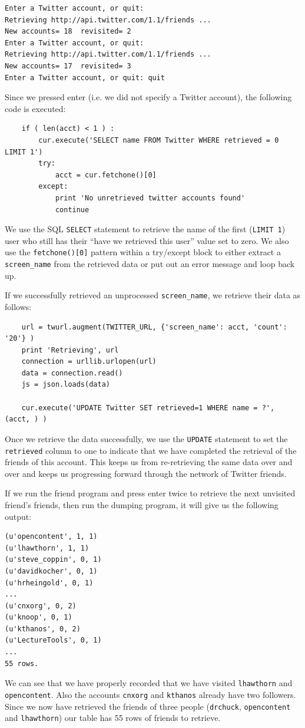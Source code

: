 \beforeverb
\begin{verbatim}
Enter a Twitter account, or quit: 
Retrieving http://api.twitter.com/1.1/friends ...
New accounts= 18  revisited= 2
Enter a Twitter account, or quit: 
Retrieving http://api.twitter.com/1.1/friends ...
New accounts= 17  revisited= 3
Enter a Twitter account, or quit: quit
\end{verbatim}
\afterverb
%
Since we pressed enter (i.e. we did not specify a Twitter account),
the following code is executed:

\beforeverb
\begin{verbatim}
    if ( len(acct) < 1 ) :
        cur.execute('SELECT name FROM Twitter WHERE retrieved = 0 LIMIT 1')
        try:
            acct = cur.fetchone()[0]
        except:
            print 'No unretrieved twitter accounts found'
            continue
\end{verbatim}
\afterverb
%
We use the SQL {\tt SELECT} statement to retrieve the name of the first 
({\tt LIMIT 1}) user who still has their ``have we retrieved this user''
value set to zero.  We also use the {\tt fetchone()[0]} pattern within 
a try/except block to either extract a \verb"screen_name" from the retrieved
data or put out an error message and loop back up.

If we successfully retrieved an unprocessed \verb"screen_name", we retrieve
their data as follows:

\beforeverb
\begin{verbatim}
    url = twurl.augment(TWITTER_URL, {'screen_name': acct, 'count': '20'} )
    print 'Retrieving', url
    connection = urllib.urlopen(url)
    data = connection.read()
    js = json.loads(data)

    cur.execute('UPDATE Twitter SET retrieved=1 WHERE name = ?', (acct, ) )
\end{verbatim}
\afterverb
%
Once we retrieve the data successfully, we use the {\tt UPDATE} statement 
to set the {\tt retrieved} column to one to indicate that we have completed 
the retrieval of the friends of this account.  This keeps us from re-retrieving
the same data over and over and keeps us progressing forward through the network
of Twitter friends.

If we run the friend program and press enter twice to retrieve the next 
unvisited friend's friends,
then run the dumping program, it will give us the following output:

\beforeverb
\begin{verbatim}
(u'opencontent', 1, 1)
(u'lhawthorn', 1, 1)
(u'steve_coppin', 0, 1)
(u'davidkocher', 0, 1)
(u'hrheingold', 0, 1)
...
(u'cnxorg', 0, 2)
(u'knoop', 0, 1)
(u'kthanos', 0, 2)
(u'LectureTools', 0, 1)
...
55 rows.
\end{verbatim}
\afterverb
%
We can see that we have properly recorded that we have visited 
{\tt lhawthorn} and {\tt opencontent}.  Also the accounts 
{\tt cnxorg} and {\tt kthanos} already have two followers.
Since we now have retrieved the friends of three people
({\tt drchuck}, {\tt opencontent} and {\tt lhawthorn}) our table has 55 rows 
of friends to retrieve.

